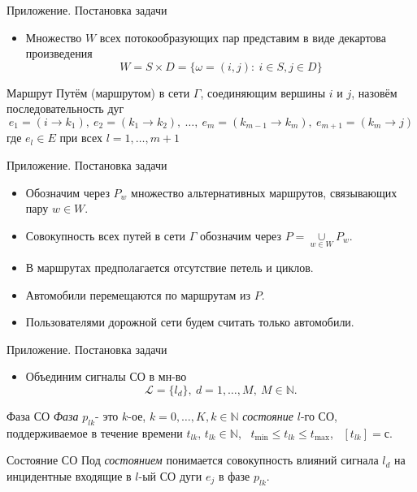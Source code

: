 \documentclass[aspectratio=169]{beamer}
\begin{document}
	\begin{frame}{Приложение. Постановка задачи}
		\begin{itemize}
			\item Множество $W$ всех потокообразующих пар представим в виде декартова произведения 
			$$
			W = S \times D = \{\omega = (i, j): \ i \in S, j \in D\}
			$$
		\end{itemize}
		\begin{block}{Маршрут}
			Путём (маршрутом) в сети $\Gamma$, соединяющим вершины $i$ и $j$, назовём последовательность дуг
			\begin{equation}
				\scriptstyle e_1 = (i\rightarrow k_1), \ e_2 = (k_1 \rightarrow k_2), \ \ldots, \ e_m = (k_{m-1} \rightarrow k_m), \  e_{m+1} = (k_m \rightarrow j)
			\end{equation}
			где $e_l \in E$ при всех $l = 1,\ldots, m+1$
		\end{block}
	\end{frame}
	
	\begin{frame}{Приложение. Постановка задачи}
		\begin{itemize}
			\item Обозначим через $P_w$ множество альтернативных маршрутов, связывающих пару $w \in W$.
			\item Совокупность всех путей в сети $\Gamma$ обозначим через $P = \underset{w \in W}{\cup}P_{w}$.
			\item В маршрутах предполагается отсутствие петель и циклов.
			\item Автомобили перемещаются по маршрутам из $P$.
			\item Пользователями дорожной сети будем считать только автомобили.
		\end{itemize}
	\end{frame}
	
	\begin{frame}{Приложение. Постановка задачи}
		\begin{itemize}
			\item Объединим сигналы СО в мн-во $$\mathcal{L} = \{ l_d \}, \ d = 1, \ldots, M, \ M \in \mathbb{N}.$$
		\end{itemize}
		\begin{block}{Фаза СО}
			\textit{Фаза} $p_{lk}$- это $k$-ое, $ k = 0, \ldots, K, k \in \mathbb{N}$ \textit{состояние} $l$-го СО, поддерживаемое в течение времени $t_{lk}$, $t_{lk} \in \mathbb{N}$, \ $t_{\min} \leq t_{lk} \leq t_{\max}$, \ $[t_{lk}] = \text{с}$.
		\end{block}
		\begin{block}{Состояние СО}
			Под \textit{состоянием} понимается совокупность влияний сигнала $l_d$ на инцидентные входящие в $l$-ый СО дуги $e_j$ в фазе $p_{lk}$.\\
		\end{block}
	\end{frame}
	
\end{document}
